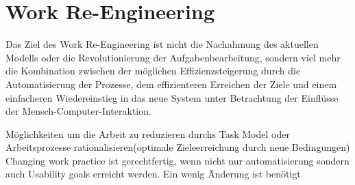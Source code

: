 \chapter{Work Re-Engineering}
Das Ziel des Work Re-Engineering ist nicht die Nachahmung des aktuellen Modells oder die Revolutionierung der Aufgabenbearbeitung, sondern viel mehr die Kombination zwischen der möglichen Effizienzsteigerung durch die Automatisierung der Prozesse, dem effizienteren Erreichen der Ziele und einem einfacheren Wiedereinstieg in das neue System unter Betrachtung der Einflüsse der Mensch-Computer-Interaktion.

Möglichkeiten um die Arbeit zu reduzieren durchs Task Model oder Arbeitsprozesse rationalisieren(optimale Zieleerreichung durch neue Bedingungen)
Changing work practice ist gerechtfertig, wenn nicht nur automatisierung sondern auch Usability goals erreicht werden.
Ein wenig Änderung ist benötigt
